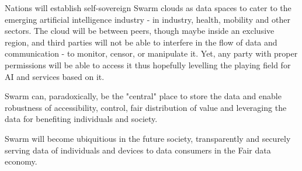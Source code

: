 Nations will establish self-sovereign Swarm clouds as data spaces to cater to the emerging artificial intelligence industry - in industry, health, mobility and other sectors. The cloud will be between peers, though maybe inside an exclusive region, and third parties will not be able to interfere in the flow of data and communication - to monitor, censor,  or manipulate it. Yet, any party with proper permissions will be able to access it thus hopefully levelling the playing field for AI and services based on it.  

Swarm can, paradoxically, be the "central" place to store the data and enable robustness of accessibility, control, fair distribution of value and leveraging the data for benefiting individuals and society.

Swarm will become ubiquitious in the future society, transparently and securely serving data of individuals and devices to data consumers in the Fair data economy.

